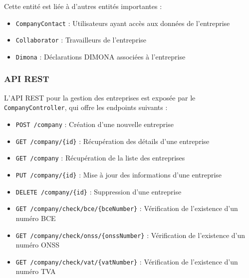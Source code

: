 \vspace{0.5cm}

Cette entité est liée à d'autres entités importantes :
\begin{itemize}[leftmargin=*,label=\textcolor{darkgray}{$\bullet$},itemsep=0.3em]
  \item \texttt{CompanyContact} : Utilisateurs ayant accès aux données de l'entreprise
  \item \texttt{Collaborator} : Travailleurs de l'entreprise
  \item \texttt{Dimona} : Déclarations DIMONA associées à l'entreprise
\end{itemize}

\subsubsection{API REST}

L'API REST pour la gestion des entreprises est exposée par le \texttt{CompanyController}, qui offre les endpoints suivants :

\vspace{0.5cm}

\begin{tcolorbox}[
  title={\textbf{Endpoints de gestion des entreprises}},
  colback=blue!5!white,
  colframe=primarycolor,
  fonttitle=\bfseries,
  boxrule=0.5mm,
  arc=2mm,
  left=6mm,
  right=6mm,
  top=6mm,
  bottom=6mm
]
\begin{itemize}[leftmargin=*,label=\textcolor{darkgray}{$\bullet$},itemsep=0.3em]
  \item \texttt{POST /company} : Création d'une nouvelle entreprise
  \item \texttt{GET /company/\{id\}} : Récupération des détails d'une entreprise
  \item \texttt{GET /company} : Récupération de la liste des entreprises
  \item \texttt{PUT /company/\{id\}} : Mise à jour des informations d'une entreprise
  \item \texttt{DELETE /company/\{id\}} : Suppression d'une entreprise
  \item \texttt{GET /company/check/bce/\{bceNumber\}} : Vérification de l'existence d'un numéro BCE
  \item \texttt{GET /company/check/onss/\{onssNumber\}} : Vérification de l'existence d'un numéro ONSS
  \item \texttt{GET /company/check/vat/\{vatNumber\}} : Vérification de l'existence d'un numéro TVA
\end{itemize}
\end{tcolorbox}

